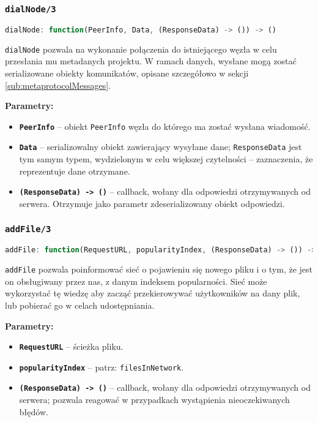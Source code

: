 % 

\subsubsection{\texttt{dialNode/3}}
\begin{lstlisting}[language=javascript]
    dialNode: function(PeerInfo, Data, (ResponseData) -> ()) -> ()
\end{lstlisting}
\texttt{dialNode} pozwala na wykonanie połączenia do istniejącego węzła w celu przesłania mu metadanych projektu. W ramach danych, wysłane mogą zostać serializowane obiekty komunikatów, opisane szczegółowo w sekcji \ref{sub:metaprotocolMessages}.

\textbf{Parametry:}
\begin{itemize}
    \item \textbf{\texttt{PeerInfo}} -- obiekt \texttt{PeerInfo} węzła do którego ma zostać wysłana wiadomość.
    \item \textbf{\texttt{Data}} -- serializowalny obiekt zawierający wysyłane dane; \texttt{ResponseData} jest tym samym typem, wydzielonym w celu większej czytelności -- zaznaczenia, że reprezentuje dane otrzymane.
    \item \textbf{\texttt{(ResponseData) -> ()}} -- callback, wołany dla odpowiedzi otrzymywanych od serwera. Otrzymuje jako parametr zdeserializowany obiekt odpowiedzi.
\end{itemize}

% 

\subsubsection{\texttt{addFile/3}}
\begin{lstlisting}[language=javascript]
    addFile: function(RequestURL, popularityIndex, (ResponseData) -> ()) -> ()
\end{lstlisting}
\texttt{addFile} pozwala poinformować sieć o pojawieniu się nowego pliku i o tym, że jest on obsługiwany przez nas, z danym indeksem popularności. Sieć może wykorzystać tę wiedzę aby zacząć przekierowywać użytkowników na dany plik, lub pobierać go w celach udostępniania.

\newpage
\textbf{Parametry:}
\begin{itemize}
    \item \textbf{\texttt{RequestURL}} -- ścieżka pliku.
    \item \textbf{\texttt{popularityIndex}} -- patrz: \texttt{filesInNetwork}.
    \item \textbf{\texttt{(ResponseData) -> ()}} -- callback, wołany dla odpowiedzi otrzymywanych od serwera; pozwala reagować w przypadkach wystąpienia nieoczekiwanych błędów.
\end{itemize}

